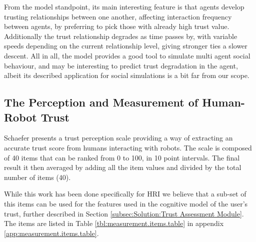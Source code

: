 From the model standpoint, its main interesting feature is that agents develop trusting relationships between one another, affecting interaction frequency between agents, by preferring to pick those with already high trust value. Additionally the trust relationship degrades as time passes by, with variable speeds depending on the current relationship level, giving stronger ties a slower descent. All in all, the model provides a good tool to simulate multi agent social behaviour, and may be interesting to predict trust degradation in the agent, albeit its described application for social simulations is a bit far from our scope.

\subsection{The Perception and Measurement of Human-Robot Trust}
\label{subsec:Related work:The Perception and Measurement of Human-Robot Trust}

Schaefer\cite{Schaefer2009} presents a trust perception scale providing a way of extracting an accurate trust score from humans interacting with robots. The scale is composed of 40 items that can be ranked from 0 to 100, in 10 point intervals. The final result it then averaged by adding all the item values and divided by the total number of items (40). 

While this work has been done specifically for \ac{HRI} we believe that a sub-set of this items can be used for the features used in the cognitive model of the user's trust, further described in Section \ref{subsec:Solution:Trust Assessment Module}. The items are listed in Table \ref{tbl:measurement.items.table} in appendix \ref{app:measurement.items.table}.

